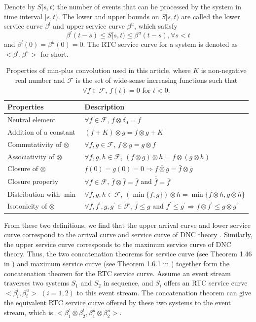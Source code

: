 \documentclass[preprint]{elsarticle}
\begin{document}
\begin{rmk}\label{rtcsc1}
Denote by $S[s,t)$ the number of events that can be processed by the system in time interval $[s,t)$. The lower and upper bounds on $S[s,t)$ are called the lower service curve $\beta^l$ and upper service curve $\beta^u$, which satisfy
$$\beta^l(t-s)\leq S[s,t)\leq \beta^u(t-s),\forall s<t$$
and $\beta^l(0)=\beta^u(0)=0$. The RTC service curve for a system is denoted as $<\beta^l,\beta^u>$ for short.
\end{rmk}

\begin{table}
  \centering
  \begin{tabular}{l|l}
    \hline\hline
    Properties & Description \\
    \hline
    Neutral element & $\forall f\in\mathcal{F}$, $f\otimes \delta_0=f$\\
    Addition of a constant & $(f+K)\otimes g=f\otimes g+K$\\
    Commutativity of $\otimes$ & $\forall f,g\in \mathcal{F}$, $f\otimes g=g\otimes f$\\
    Associativity of $\otimes$ & $\forall f,g,h\in \mathcal{F}$, $(f\otimes g)\otimes h=f\otimes (g\otimes h)$\\
    Closure of $\otimes$ & $f(0)=g(0)=0\Rightarrow \overline{f\otimes g}=\bar{f}\otimes\bar{g}$\\
    Closure property & $\forall f\in\mathcal{F}$, $\bar{f}\otimes \bar{f}=\bar{f}$ and $\bar{\bar{f}}=\bar{f}$\\
    Distribution with $\min$ & $\forall f,g,h\in \mathcal{F}$, $(\min\{f,g\})\otimes h=\min\{f\otimes h,g\otimes h\}$\\
    Isotonicity of $\otimes$ & $\forall f,f^\prime,g,g^\prime\in \mathcal{F}$, $f\leq g$ and $f^\prime\leq g^\prime\Rightarrow f\otimes f^\prime\leq g\otimes g^\prime$\\
    \hline
  \end{tabular}
  \caption{Properties of min-plus convolution used in this article, where $K$ is non-negative real number and $\mathcal{F}$ is the set of wide-sense increasing functions such that $\forall f\in\mathcal{F}$, $f(t)=0$ for $t<0$.}\label{properties}
\end{table}

From these two definitions, we find that the upper arrival curve and lower service curve correspond to the arrival curve and service curve of DNC theory \cite{Boudec2001Network}. Similarly, the upper service curve corresponds to the maximum service curve of DNC theory. Thus, the two concatenation theorems for service curve (see Theorem 1.46 in \cite{Boudec2001Network}) and maximum service curve (see Theorem 1.6.1 in \cite{Boudec2001Network}) together form the concatenation theorem for the RTC service curve. Assume an event stream traverses two systems $S_1$ and $S_2$ in sequence, and $S_i$ offers an RTC service curve $<\beta^l_i,\beta^u_i>$ $(i=1,2)$ to this event stream. The concatenation theorem can give the equivalent RTC service curve offered by these two systems to the event stream, which is $<\beta^l_1\otimes\beta^l_2,\beta^u_1\otimes\beta^u_2>$.
\end{document}
